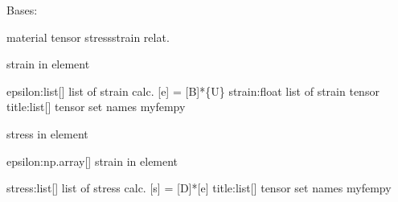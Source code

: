 \documentclass[letterpaper,10pt,english]{sphinxmanual}
\begin{document}
\begin{fulllineitems}
\label{\detokenize{myfempy.felib.materials:myfempy.felib.materials.axial.Tensor}}
\pysigstartsignatures
{}
\pysigstopsignatures
\sphinxAtStartPar
Bases: 

\sphinxAtStartPar
material tensor stress\sphinxhyphen{}strain relat.

\begin{fulllineitems}
\label{\detokenize{myfempy.felib.materials:myfempy.felib.materials.axial.Tensor.strain}}
\pysigstartsignatures
{}
\pysigstopsignatures
\sphinxAtStartPar
strain in element
\begin{description}
\sphinxAtStartPar
epsilon:list{[}{]}  \textendash{} list of strain calc. {[}e{]} = {[}B{]}*\{U\}
strain:float    \textendash{} list of strain tensor
title:list{[}{]}    \textendash{} tensor set names myfempy

\end{description}

\end{fulllineitems}


\begin{fulllineitems}
\label{\detokenize{myfempy.felib.materials:myfempy.felib.materials.axial.Tensor.stress}}
\pysigstartsignatures
{}
\pysigstopsignatures
\sphinxAtStartPar
stress in element
\begin{description}
\sphinxAtStartPar
epsilon:np.array{[}{]} \textendash{} strain in element

\sphinxAtStartPar
stress:list{[}{]}   \textendash{} list of stress calc. {[}s{]} = {[}D{]}*{[}e{]}
title:list{[}{]}    \textendash{} tensor set names myfempy

\end{description}

\end{fulllineitems}


\end{fulllineitems}
\end{document}
